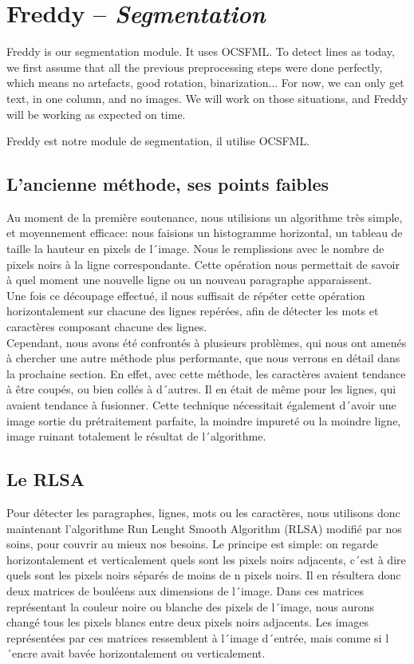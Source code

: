 \chapter{Freddy -- \emph{Segmentation}}

Freddy is our segmentation module. It uses OCSFML.
To detect lines as today, we first assume that all the previous preprocessing steps were done perfectly, which means no artefacts, good rotation, binarization... For now, we can only get text, in one column, and no images. We will work on those situations, and Freddy will be working as expected on time.

Freddy est notre module de segmentation, il utilise OCSFML.

\section{L'ancienne méthode, ses points faibles}

Au moment de la première soutenance, nous utilisions un algorithme très simple, et moyennement efficace: nous faisions un histogramme horizontal, un tableau de taille la hauteur en pixels de l´image. Nous le remplissions avec le nombre de pixels noirs à la ligne correspondante. Cette opération nous permettait de savoir à quel moment une nouvelle ligne ou un nouveau paragraphe apparaissent.\\
Une fois ce découpage effectué, il nous suffisait de répéter cette opération horizontalement sur chacune des lignes repérées, afin de détecter les mots et caractères composant chacune des lignes.\\
Cependant, nous avons été confrontés à plusieurs problèmes, qui nous ont amenés à chercher une autre méthode plus performante, que nous verrons en détail dans la prochaine section. En effet, avec cette méthode, les caractères avaient tendance à être coupés, ou bien collés à d´autres. Il en était de même pour les lignes, qui avaient tendance à fusionner. Cette technique nécessitait également d´avoir une image sortie du prétraitement parfaite, la moindre impureté ou la moindre ligne, image ruinant totalement le résultat de l´algorithme.

\section{Le RLSA}

Pour détecter les paragraphes, lignes, mots ou les caractères, nous utilisons donc maintenant l'algorithme Run Lenght Smooth Algorithm (RLSA) modifié par nos soins, pour couvrir au mieux nos besoins. Le principe est simple: on regarde horizontalement et verticalement quels sont les pixels noirs adjacents, c´est à dire quels sont les pixels noirs séparés de moins de n pixels noirs. Il en résultera donc deux matrices de bouléens aux dimensions de l´image. Dans ces matrices représentant la couleur noire ou blanche des pixels de l´image, nous aurons changé tous les pixels blancs entre deux pixels noirs adjacents. Les images représentées par ces matrices ressemblent à l´image d´entrée, mais comme si l´encre avait bavée horizontalement ou verticalement.

